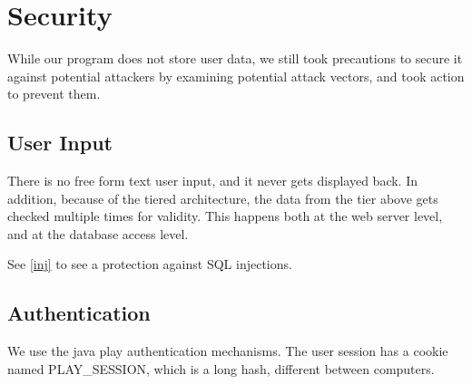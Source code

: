 \section{Security}

While our program does not store user data,
we still took precautions to secure it against potential attackers by examining 
potential attack vectors, and took action to prevent them.

\subsection{User Input}
There is no free form text user input, and it never gets displayed back.
In addition, because of the tiered architecture, the data from the tier above gets checked multiple times for validity.
This happens both at the web server level, and at the database access level.

See \ref{inj} to see a protection against SQL injections.


\subsection{Authentication}
We use the java play authentication mechanisms.
The user session has a cookie named PLAY\_SESSION, which is a long hash, different between computers.

